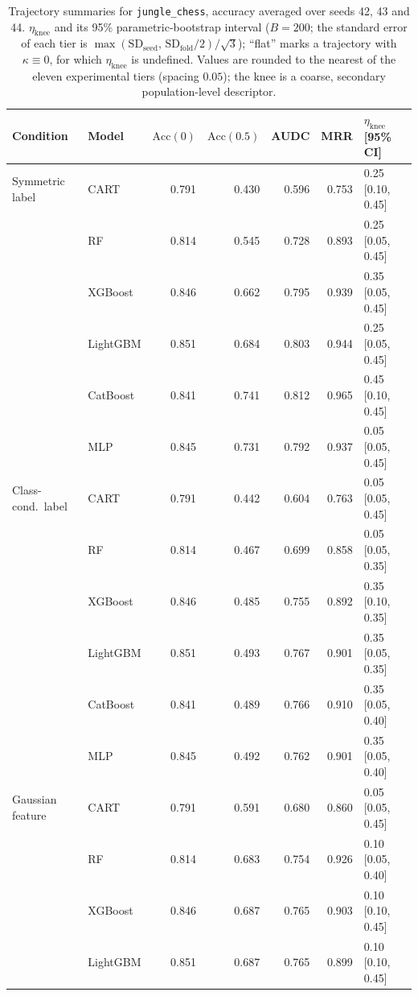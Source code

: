 \begin{table}[p]
\centering
\scriptsize
\setlength{\tabcolsep}{3.5pt}
\caption{Trajectory summaries for \texttt{jungle\_chess}, accuracy averaged over seeds 42, 43 and 44. $\eta_{\mathrm{knee}}$ and its 95\% parametric-bootstrap interval ($B=200$; the standard error of each tier is $\max(\mathrm{SD}_{\mathrm{seed}},\,\mathrm{SD}_{\mathrm{fold}}/2)/\sqrt3$); ``flat'' marks a trajectory with $\kappa\equiv 0$, for which $\eta_{\mathrm{knee}}$ is undefined. Values are rounded to the nearest of the eleven experimental tiers (spacing $0.05$); the knee is a coarse, secondary population-level descriptor.}
\label{tab:traj_jungle_chess}
\begin{tabular}{@{}llrrrrl@{}}
\toprule
Condition & Model & $\mathrm{Acc}(0)$ & $\mathrm{Acc}(0.5)$ & AUDC & MRR & $\eta_{\mathrm{knee}}$ [95\% CI] \\
\midrule
Symmetric label & CART & 0.791 & 0.430 & 0.596 & 0.753 & 0.25 [0.10, 0.45] \\
 & RF & 0.814 & 0.545 & 0.728 & 0.893 & 0.25 [0.05, 0.45] \\
 & XGBoost & 0.846 & 0.662 & 0.795 & 0.939 & 0.35 [0.05, 0.45] \\
 & LightGBM & 0.851 & 0.684 & 0.803 & 0.944 & 0.25 [0.05, 0.45] \\
 & CatBoost & 0.841 & 0.741 & 0.812 & 0.965 & 0.45 [0.10, 0.45] \\
 & MLP & 0.845 & 0.731 & 0.792 & 0.937 & 0.05 [0.05, 0.45] \\
\midrule
Class-cond.\ label & CART & 0.791 & 0.442 & 0.604 & 0.763 & 0.05 [0.05, 0.45] \\
 & RF & 0.814 & 0.467 & 0.699 & 0.858 & 0.05 [0.05, 0.35] \\
 & XGBoost & 0.846 & 0.485 & 0.755 & 0.892 & 0.35 [0.10, 0.35] \\
 & LightGBM & 0.851 & 0.493 & 0.767 & 0.901 & 0.35 [0.05, 0.35] \\
 & CatBoost & 0.841 & 0.489 & 0.766 & 0.910 & 0.35 [0.05, 0.40] \\
 & MLP & 0.845 & 0.492 & 0.762 & 0.901 & 0.35 [0.05, 0.40] \\
\midrule
Gaussian feature & CART & 0.791 & 0.591 & 0.680 & 0.860 & 0.05 [0.05, 0.45] \\
 & RF & 0.814 & 0.683 & 0.754 & 0.926 & 0.10 [0.05, 0.40] \\
 & XGBoost & 0.846 & 0.687 & 0.765 & 0.903 & 0.10 [0.10, 0.45] \\
 & LightGBM & 0.851 & 0.687 & 0.765 & 0.899 & 0.10 [0.10, 0.45] \\

\end{tabular}
\end{table}
